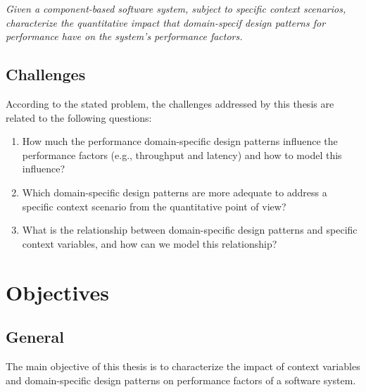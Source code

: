 \textit{Given a component-based software system, subject to specific context scenarios, characterize the quantitative impact that domain-specif design patterns for performance have on the system's performance factors.}


\subsection{Challenges}
\label{sec:Challenges}

According to the stated problem, the challenges addressed by this thesis are related to the following questions:

\renewcommand{\theenumi}{\thesubsection.\arabic{enumi}}
\begin{enumerate}
	\item How much the performance domain-specific design patterns influence the performance factors (e.g., throughput and latency) and how to model this influence?
	      	
	\item Which domain-specific design patterns are more adequate to address a specific context scenario from the quantitative point of view? 
	
	\item What is the relationship between domain-specific design patterns and specific context variables, and how can we model this relationship?
	      	
\end{enumerate}
\renewcommand{\theenumi}{\thesubsection.\arabic{enumi}}


\section{Objectives}
\label{cha:Objectives}

\subsection{General}

The main objective of this thesis is to characterize the impact of context variables and domain-specific design patterns on performance factors of a software system.

